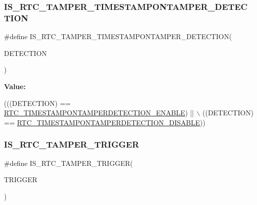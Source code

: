 \subsubsection{\texorpdfstring{I\+S\+\_\+\+R\+T\+C\+\_\+\+T\+A\+M\+P\+E\+R\+\_\+\+T\+I\+M\+E\+S\+T\+A\+M\+P\+O\+N\+T\+A\+M\+P\+E\+R\+\_\+\+D\+E\+T\+E\+C\+T\+I\+ON}{IS\_RTC\_TAMPER\_TIMESTAMPONTAMPER\_DETECTION}}
{\footnotesize\ttfamily \#define I\+S\+\_\+\+R\+T\+C\+\_\+\+T\+A\+M\+P\+E\+R\+\_\+\+T\+I\+M\+E\+S\+T\+A\+M\+P\+O\+N\+T\+A\+M\+P\+E\+R\+\_\+\+D\+E\+T\+E\+C\+T\+I\+ON(\begin{DoxyParamCaption}\item[{}]{D\+E\+T\+E\+C\+T\+I\+ON }\end{DoxyParamCaption})}

{\bfseries Value\+:}
\begin{DoxyCode}
(((DETECTION) == \hyperlink{group___r_t_c_ex___tamper___time_stamp_on_tamper_detection___definitions_ga5954385741ff0e2b250438c493bc0e36}{RTC\_TIMESTAMPONTAMPERDETECTION\_ENABLE}) || \(\backslash\)
                                                              ((DETECTION) == 
      \hyperlink{group___r_t_c_ex___tamper___time_stamp_on_tamper_detection___definitions_ga11e98cb1fff680cf391398c40925f891}{RTC\_TIMESTAMPONTAMPERDETECTION\_DISABLE}))
\end{DoxyCode}
\mbox{\label{group___r_t_c_ex___i_s___r_t_c___definitions_ga4b0308730f7fa04b8db39270d0b90ca5}} 
\subsubsection{\texorpdfstring{I\+S\+\_\+\+R\+T\+C\+\_\+\+T\+A\+M\+P\+E\+R\+\_\+\+T\+R\+I\+G\+G\+ER}{IS\_RTC\_TAMPER\_TRIGGER}}
{\footnotesize\ttfamily \#define I\+S\+\_\+\+R\+T\+C\+\_\+\+T\+A\+M\+P\+E\+R\+\_\+\+T\+R\+I\+G\+G\+ER(\begin{DoxyParamCaption}\item[{}]{T\+R\+I\+G\+G\+ER }\end{DoxyParamCaption})}

